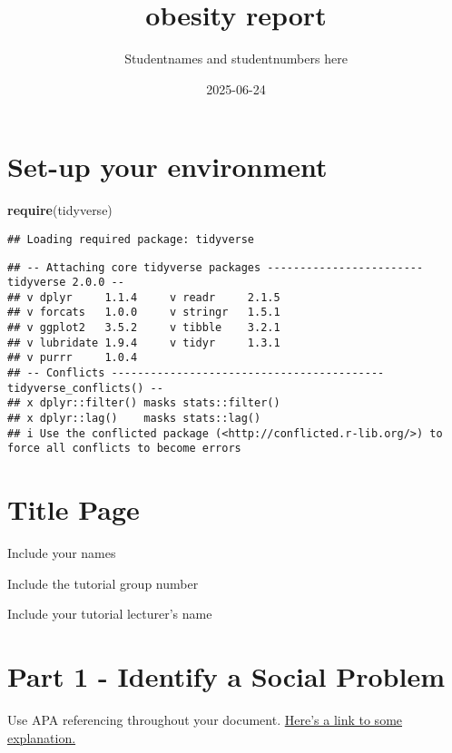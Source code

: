 \documentclass[
]{article}
\title{obesity report}
\author{Studentnames and studentnumbers here}
\date{2025-06-24}
\newenvironment{Shaded}{\begin{snugshade}}{\end{snugshade}}
\newcommand{\FunctionTok}[1]{\textcolor[rgb]{0.13,0.29,0.53}{\textbf{#1}}}
\newcommand{\NormalTok}[1]{#1}
\begin{document}
\maketitle

\section{Set-up your environment}\label{set-up-your-environment}

\begin{Shaded}
\begin{Highlighting}[]
\FunctionTok{require}\NormalTok{(tidyverse)}
\end{Highlighting}
\end{Shaded}

\begin{verbatim}
## Loading required package: tidyverse
\end{verbatim}

\begin{verbatim}
## -- Attaching core tidyverse packages ------------------------ tidyverse 2.0.0 --
## v dplyr     1.1.4     v readr     2.1.5
## v forcats   1.0.0     v stringr   1.5.1
## v ggplot2   3.5.2     v tibble    3.2.1
## v lubridate 1.9.4     v tidyr     1.3.1
## v purrr     1.0.4     
## -- Conflicts ------------------------------------------ tidyverse_conflicts() --
## x dplyr::filter() masks stats::filter()
## x dplyr::lag()    masks stats::lag()
## i Use the conflicted package (<http://conflicted.r-lib.org/>) to force all conflicts to become errors
\end{verbatim}

\section{Title Page}\label{title-page}

Include your names

Include the tutorial group number

Include your tutorial lecturer's name

\section{Part 1 - Identify a Social
Problem}\label{part-1---identify-a-social-problem}

Use APA referencing throughout your document.
\href{https://www.mendeley.com/guides/apa-citation-guide/}{Here's a link
to some explanation.}
\end{document}
